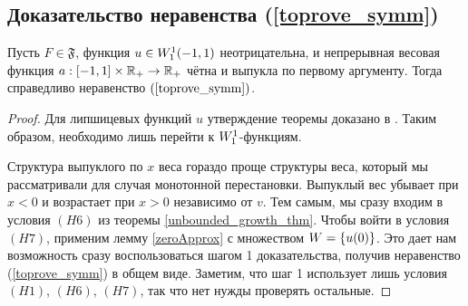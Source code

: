 \subsection{Доказательство неравенства (\ref{toprove_symm})}
\label{sobolevSymm}

\begin{thm}
\label{symmThm}
Пусть $F \in \mathfrak{F}$, функция $u \in W_1^1(-1, 1)$ неотрицательна,
и непрерывная весовая функция $a: [-1, 1] \times \mathbb R_+ \to \mathbb R_+$ чётна и выпукла по первому аргументу.
Тогда справедливо неравенство $(\ref{toprove_symm})$.
\end{thm}

\begin{proof}
Для липшицевых функций $u$ утверждение теоремы доказано в \cite{Brock}.
Таким образом, необходимо лишь перейти к $W_1^1$-функциям.

Структура выпуклого по $x$ веса гораздо проще структуры веса,
который мы рассматривали для случая монотонной перестановки.
Выпуклый вес убывает при $x < 0$ и возрастает при $x > 0$ независимо от $v$.
Тем самым, мы сразу входим в условия $(H6)$ из теоремы \ref{unbounded_growth_thm}.
Чтобы войти в условия $(H7)$, применим лемму \ref{zeroApprox} с множеством $W = \{u(0)\}$.
Это дает нам возможность сразу воспользоваться шагом 1 доказательства,
получив неравенство (\ref{toprove_symm}) в общем виде.
Заметим, что шаг 1 использует лишь условия $(H1)$, $(H6)$, $(H7)$, так что нет нужды проверять остальные.
\end{proof}

